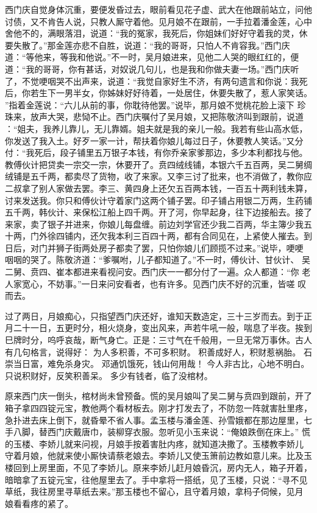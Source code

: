 西门庆自觉身体沉重，要便发昏过去，眼前看见花子虚、武大在他跟前站立，问他
讨债，又不肯告人说，只教人厮守着他。见月娘不在跟前，一手拉着潘金莲，心中
舍他不的，满眼落泪，说道：“我的冤家，我死后，你姐妹们好好守着我的灵，休
要失散了。”那金莲亦悲不自胜，说道：“我的哥哥，只怕人不肯容我。”西门庆
道：“等他来，等我和他说。”不一时，吴月娘进来，见他二人哭的眼红红的，便
道：“我的哥哥，你有甚话，对奴说几句儿，也是我和你做夫妻一场。”西门庆听
了，不觉哽咽哭不出声来，说道：“我觉自家好生不济，有两句遗言和你说：我死
后，你若生下一男半女，你姊妹好好待着，一处居住，休要失散了，惹人家笑话。
”指着金莲说：“六儿从前的事，你耽待他罢。”说毕，那月娘不觉桃花脸上滚下
珍珠来，放声大哭，悲恸不止。西门庆嘱付了吴月娘，又把陈敬济叫到跟前，说道
：“姐夫，我养儿靠儿，无儿靠婿。姐夫就是我的亲儿一般。我若有些山高水低，
你发送了我入土。好歹一家一计，帮扶着你娘儿每过日子，休要教人笑话。”又分
付：“我死后，段子铺里五万银子本钱，有你乔亲家爹那边，多少本利都找与他。
教傅伙计把贷卖一宗交一宗，休要开了。贲四绒线铺，本银六千五百两，吴二舅绸
绒铺是五千两，都卖尽了货物，收了来家。又李三讨了批来，也不消做了，教你应
二叔拿了别人家做去罢。李三、黄四身上还欠五百两本钱，一百五十两利钱未算，
讨来发送我。你只和傅伙计守着家门这两个铺子罢。印子铺占用银二万两，生药铺
五千两，韩伙计、来保松江船上四千两。开了河，你早起身，往下边接船去。接了
来家，卖了银子并进来，你娘儿每盘缠。前边刘学官还少我二百两，华主簿少我五
十两，门外徐四铺内，还欠我本利三百四十两，都有合同见在，上紧使人摧去。到
日后，对门并狮子街两处房子都卖了罢，只怕你娘儿们顾揽不过来。”说毕，哽哽
咽咽的哭了。陈敬济道：“爹嘱咐，儿子都知道了。”不一时，傅伙计、甘伙计、
吴二舅、贲四、崔本都进来看视问安。西门庆一一都分付了一遍。众人都道：“你
老人家宽心，不妨事。”一日来问安看者，也有许多。见西门庆不好的沉重，皆嗟
叹而去。

过了两日，月娘痴心，只指望西门庆还好，谁知天数造定，三十三岁而去。到于正
月二十一日，五更时分，相火烧身，变出风来，声若牛吼一般，喘息了半夜。挨到
巳牌时分，呜呼哀哉，断气身亡。正是：三寸气在千般用，一旦无常万事休。古人
有几句格言，说得好：
为人多积善，不可多积财。
积善成好人，积财惹祸胎。
石崇当日富，难免杀身灾。
邓通饥饿死，钱山何用哉！
今人非古比，心地不明白。
只说积财好，反笑积善呆。
多少有钱者，临了没棺材。

原来西门庆一倒头，棺材尚未曾预备。慌的吴月娘叫了吴二舅与贲四到跟前，开了
箱子拿四四锭元宝，教他两个看材板去。刚才打发去了，不防忽一阵就害肚里疼，
急扑进去床上倒下，就昏晕不省人事。孟玉楼与潘金莲、孙雪娥都在那边屋里，七
手八脚，替西门庆戴唐巾，装柳穿衣服。忽听见小玉来说：“俺娘跌倒在床上。”
慌的玉楼、李娇儿就来问视，月娘手按着害肚内疼，就知道决撒了。玉楼教李娇儿
守着月娘，他就来使小厮快请蔡老娘去。李娇儿又使玉箫前边教如意儿来。比及玉
楼回到上房里面，不见了李娇儿。原来李娇儿赶月娘昏沉，房内无人，箱子开着，
暗暗拿了五锭元宝，往他屋里去了。手中拿将一搭纸，见了玉楼，只说：“寻不见
草纸，我往房里寻草纸去来。”那玉楼也不留心，且守着月娘，拿杩子伺候，见月
娘看看疼的紧了。

